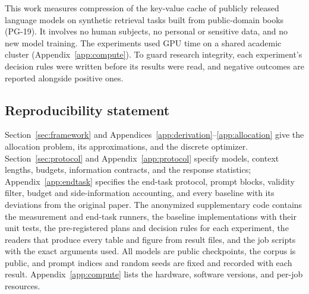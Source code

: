 \documentclass{article}
\newif\ifshowest \showesttrue
\DeclareRobustCommand{\estonly}[1]{\ifshowest#1\else\ifhmode\unskip\fi\fi}
\theoremstyle{definition}
\begin{document}
This work measures compression of the key-value cache of publicly released language models on synthetic retrieval tasks built from public-domain books (PG-19).  It involves no human subjects, no personal or sensitive data, and no new model training.  The experiments used GPU time on a shared academic cluster (Appendix~\ref{app:compute}).  To guard research integrity, each experiment's decision rules were written before its results were read, and negative outcomes are reported alongside positive ones. %

\subsection*{Reproducibility statement}

Section~\ref{sec:framework} and Appendices~\ref{app:derivation}--\ref{app:allocation} give the allocation problem, its approximations, and the discrete optimizer.  Section~\ref{sec:protocol} and Appendix~\ref{app:protocol} specify models, context lengths, budgets, information contracts, and the response statistics; Appendix~\ref{app:endtask} specifies the end-task protocol, prompt blocks, validity filter, budget and side-information accounting, and every baseline with its deviations from the original paper.  The anonymized supplementary code contains the measurement and end-task runners, the baseline implementations with their unit tests, the pre-registered plans and decision rules for each experiment, the readers that produce every table and figure from result files, and the job scripts with the exact arguments used.  All models are public checkpoints, the corpus is public, and prompt indices and random seeds are fixed and recorded with each result.  Appendix~\ref{app:compute} lists the hardware, software versions, and per-job resources.




\clearpage
\appendix

\end{document}
